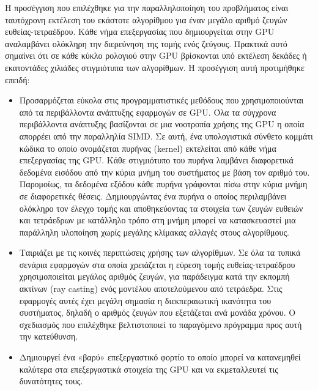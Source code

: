 Η προσέγγιση που επιλέχθηκε για την παραλληλοποίηση του προβλήματος είναι ταυτόχρονη εκτέλεση του εκάστοτε αλγορίθμου για έναν μεγάλο αριθμό ζευγών ευθείας-τετραέδρου. Κάθε νήμα επεξεργασίας που δημιουργείται στην GPU αναλαμβάνει ολόκληρη την διερεύνηση της τομής ενός ζεύγους. Πρακτικά αυτό σημαίνει ότι σε κάθε κύκλο ρολογιού στην GPU βρίσκονται υπό εκτέλεση δεκάδες ή εκατοντάδες χιλιάδες στιγμιότυπα των αλγορίθμων. Η προσέγγιση αυτή προτιμήθηκε επειδή:
\begin{itemize}
\item Προσαρμόζεται εύκολα στις προγραμματιστικές μεθόδους που χρησιμοποιούνται από τα περιβάλλοντα ανάπτυξης εφαρμογών σε GPU. Όλα τα σύγχρονα περιβάλλοντα ανάπτυξης βασίζονται σε μια νοοτροπία χρήσης της GPU η οποία απορρέει από την παραλληλία SIMD. Σε αυτή, ένα υπολογιστικά σύνθετο κομμάτι κώδικα το οποίο ονομάζεται πυρήνας (kernel) εκτελείται από κάθε νήμα επεξεργασίας της GPU. Κάθε στιγμιότυπο του πυρήνα λαμβάνει διαφορετικά δεδομένα εισόδου από την κύρια μνήμη του συστήματος με βάση τον αριθμό του. Παρομοίως, τα δεδομένα εξόδου κάθε πυρήνα γράφονται πίσω στην κύρια μνήμη σε διαφορετικές θέσεις. Δημιουργώντας ένα πυρήνα ο οποίος περιλαμβάνει ολόκληρο τον έλεγχο τομής και αποθηκεύοντας τα στοιχεία των ζευγών ευθειών και τετράεδρων με κατάλληλο τρόπο στη μνήμη μπορεί να κατασκευαστεί μια παράλληλη υλοποίηση χωρίς μεγάλης κλίμακας αλλαγές στους αλγορίθμους. 
\item Ταιριάζει με τις κοινές περιπτώσεις χρήσης των αλγορίθμων. Σε όλα τα τυπικά σενάρια εφαρμογών στα οποία χρειάζεται η εύρεση τομής ευθείας-τετραέδρου χρησιμοποιείται μεγάλος αριθμός ζευγών, για παράδειγμα κατά την εκπομπή ακτίνων (ray casting) ενός μοντέλου αποτελούμενου από τετράεδρα. Στις εφαρμογές αυτές έχει μεγάλη σημασία η διεκπεραιωτική ικανότητα του συστήματος, δηλαδή ο αριθμός ζευγών που εξετάζεται ανά μονάδα χρόνου. Ο σχεδιασμός που επιλέχθηκε βελτιστοποιεί το παραγόμενο πρόγραμμα προς αυτή την κατεύθυνση.
\item Δημιουργεί ένα «βαρύ» επεξεργαστικό φορτίο το οποίο μπορεί να κατανεμηθεί καλύτερα στα επεξεργαστικά στοιχεία της GPU και να   εκμεταλλευτεί τις δυνατότητες τους.

\end{itemize}


         